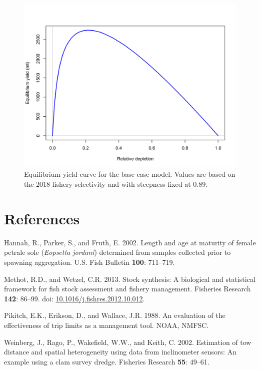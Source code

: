 \documentclass[12pt,]{article}
\begin{document}
\FloatBarrier

\begin{figure}
\centering
\includegraphics{r4ss/plots_mod1/yield1_yield_curve.png}
\caption{Equilibrium yield curve for the base case model. Values are
based on the 2018 fishery selectivity and with steepness fixed at 0.89.
\label{fig:yield}}
\end{figure}

\FloatBarrier

\newpage

\color{black}

\section{References}\label{references}

\renewcommand{\thepage}{}

\hypertarget{refs}{}
\hypertarget{ref-hannah_length_2002}{}
Hannah, R., Parker, S., and Fruth, E. 2002. Length and age at maturity
of female petrale sole (\emph{Eopsetta jordani}) determined from samples
collected prior to spawning aggregation. U.S. Fish Bulletin
\textbf{100}: 711--719.

\hypertarget{ref-methot_stock_2013}{}
Methot, R.D., and Wetzel, C.R. 2013. Stock synthesis: A biological and
statistical framework for fish stock assessment and fishery management.
Fisheries Research \textbf{142}: 86--99. doi:
\href{https://doi.org/10.1016/j.fishres.2012.10.012}{10.1016/j.fishres.2012.10.012}.

\hypertarget{ref-pikitch_evaluation_1988}{}
Pikitch, E.K., Erikson, D., and Wallace, J.R. 1988. An evaluation of the
effectiveness of trip limits as a management tool. NOAA, NMFSC.

\hypertarget{ref-weinberg_estimation_2002}{}
Weinberg, J., Rago, P., Wakefield, W.W., and Keith, C. 2002. Estimation
of tow distance and spatial heterogeneity using data from inclinometer
sensors: An example using a clam survey dredge. Fisheries Research
\textbf{55}: 49--61.
\end{document}
